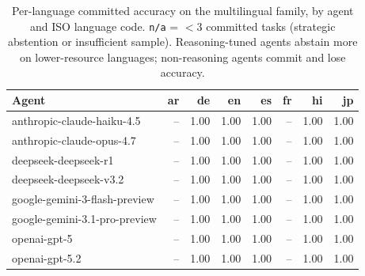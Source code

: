 \begin{table}[t]\centering\small
\caption{Per-language committed accuracy on the multilingual family, by agent and ISO language code. \texttt{n/a} = $<3$ committed tasks (strategic abstention or insufficient sample). Reasoning-tuned agents abstain more on lower-resource languages; non-reasoning agents commit and lose accuracy.}
\label{tab:multi-v2-per-language}
\begin{tabular}{lrrrrrrr}
\toprule
Agent & ar & de & en & es & fr & hi & jp \\
\midrule
anthropic-claude-haiku-4.5 & -- & 1.00 & 1.00 & 1.00 & -- & 1.00 & 1.00 \\
anthropic-claude-opus-4.7 & -- & 1.00 & 1.00 & 1.00 & -- & 1.00 & 1.00 \\
deepseek-deepseek-r1 & -- & 1.00 & 1.00 & 1.00 & -- & 1.00 & 1.00 \\
deepseek-deepseek-v3.2 & -- & 1.00 & 1.00 & 1.00 & -- & 1.00 & 1.00 \\
google-gemini-3-flash-preview & -- & 1.00 & 1.00 & 1.00 & -- & 1.00 & 1.00 \\
google-gemini-3.1-pro-preview & -- & 1.00 & 1.00 & 1.00 & -- & 1.00 & 1.00 \\
openai-gpt-5 & -- & 1.00 & 1.00 & 1.00 & -- & 1.00 & 1.00 \\
openai-gpt-5.2 & -- & 1.00 & 1.00 & 1.00 & -- & 1.00 & 1.00 \\
\bottomrule
\end{tabular}
\end{table}